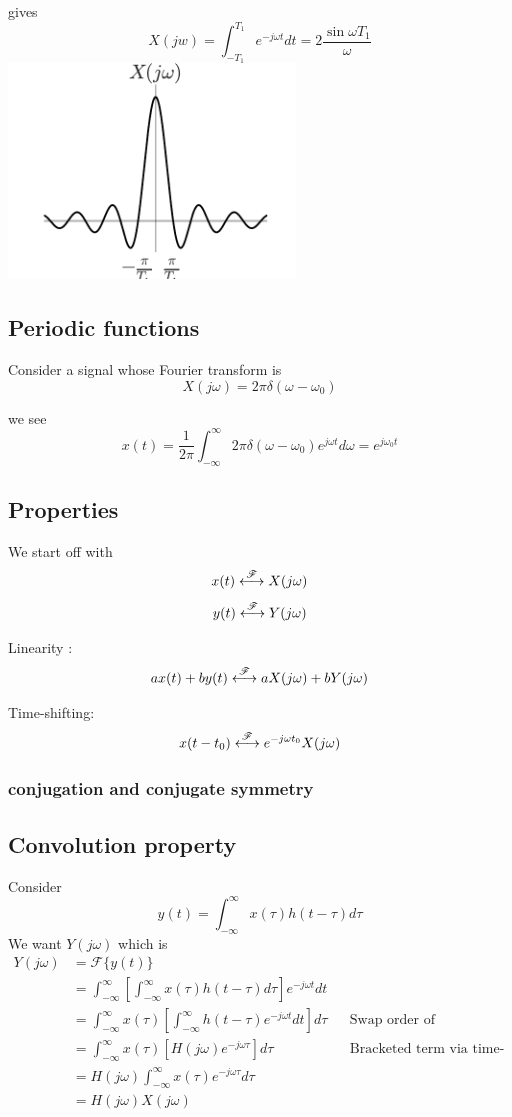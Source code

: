 gives 
\[
X(jw) = \int_{-T_1}^{T_1} e^{-j\omega t} dt = 2 \frac{\sin \omega T_1}{\omega}
\]
\includegraphics[width=3in]{notes.02.sinc.pdf}


\subsection{Periodic functions}
Consider a signal whose Fourier transform is 
\[
X(j\omega) = 2 \pi \delta(\omega - \omega_0)
\]

we see
\[
x(t) = \frac{1}{2\pi}\int_{-\infty}^{\infty} 2\pi \delta(\omega - \omega_0) e^{j \omega t} d\omega = e^{j\omega_0  t}
\]



\subsection{Properties}
We start off with 
\[ 
x(t) \stackrel{\mathscr{F}}{\longleftrightarrow} X(j\omega)
\]
\[ 
y(t) \stackrel{\mathscr{F}}{\longleftrightarrow} Y(j\omega)
\]

Linearity : 
\[
ax(t) + by(t) \stackrel{\mathscr{F}}{\longleftrightarrow} aX(j\omega) + bY(j\omega)
\]

Time-shifting: 
\[
x(t - t_0) \stackrel{\mathscr{F}}{\longleftrightarrow} e^{-j\omega t_0}X(j\omega)
\]

\subsubsection{conjugation and conjugate symmetry}
\subsection{Convolution property}
Consider 
\[
y(t) = \int_{-\infty}^{\infty}x(\tau) h(t-\tau) d\tau
\]
We want $Y(j\omega)$ which is 
\begin{align}
Y(j\omega) &= \mathscr{F} \{ y(t) \} \\
&= \int_{-\infty}^{\infty} \left[ \int_{-\infty}^{\infty}x(\tau) h(t-\tau) d\tau \right]  e^{-j \omega t} dt \\
& = \int_{-\infty}^{\infty} x(\tau) \left[ \int_{-\infty}^{\infty}h(t-\tau) e^{-j\omega t} dt \right]  d\tau && \text{Swap order of integration}\\
& = \int_{-\infty}^{\infty} x(\tau) \left[ H(j\omega) e^{-j\omega \tau} \right] d\tau  && \text{Bracketed term via time-shifting}\\
& = H(j\omega) \int_{-\infty}^{\infty} x(\tau) e^{-j\omega \tau} d\tau \\
& = H(j\omega) X(j\omega) 
\end{align}


